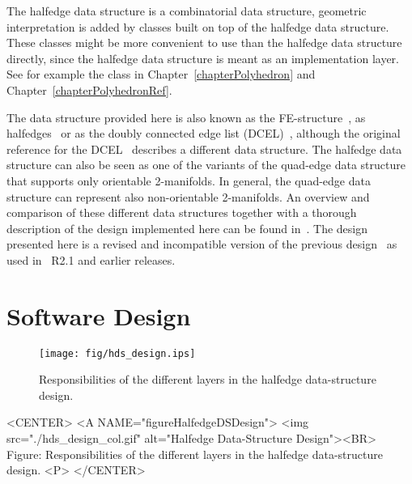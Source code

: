 The halfedge data structure is a combinatorial data structure,
geometric interpretation is added by classes built on top of the
halfedge data structure.  These classes might be more convenient to
use than the halfedge data structure directly, since the halfedge data
structure is meant as an implementation layer.  See for example the
 class in Chapter~\ref{chapterPolyhedron}
and Chapter~\ref{chapterPolyhedronRef}.

The data structure provided here is also known as the
FE-structure~\cite{w-ebdss-85}, as
halfedges~\cite{m-ism-88,bfh-mgedm-95} or as the doubly connected edge
list (DCEL)~\cite{bkos-cgaa-97}, although the original reference for
the DCEL~\cite{mp-fitcp-78} describes a different data structure. The
halfedge data structure can also be seen as one of the variants of the
quad-edge data structure~\cite{gs-pmgsc-85} that supports only
orientable 2-manifolds. In general, the quad-edge data structure can
represent also non-orientable 2-manifolds.  An overview and comparison
of these different data structures together with a thorough
description of the design implemented here can be found
in~\cite{k-ugpdd-99}.  The design presented here is a revised and
incompatible version of the previous design~\cite{k-ddsps-98} as used
in \cgal\ R2.1 and earlier releases.

\section{Software Design}


\begin{ccTexOnly}
  \begin{figure}
    \begin{center}
      \parbox{0.7\textwidth}{%
          \texttt{[image: fig/hds\_design.ips]}%
      }
    \end{center}
    \caption{Responsibilities of the different layers in the 
             halfedge data-structure design.}
    \label{figureHalfedgeDSDesign}
  \end{figure}
\end{ccTexOnly}

\begin{ccHtmlOnly}
    <CENTER>
    <A NAME="figureHalfedgeDSDesign">
        <img src="./hds_design_col.gif"
         alt="Halfedge Data-Structure Design"><BR>
    Figure: Responsibilities of the different layers in the 
            halfedge data-structure design.
    <P>
    </CENTER>
\end{ccHtmlOnly}

